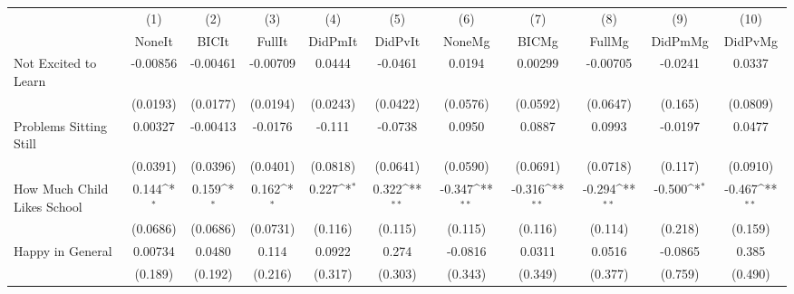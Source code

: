 {
\def\sym#1{\ifmmode^{#1}\else\(^{#1}\)\fi}
\begin{tabular}{l*{10}{c}}
\toprule
            &\multicolumn{1}{c}{(1)}&\multicolumn{1}{c}{(2)}&\multicolumn{1}{c}{(3)}&\multicolumn{1}{c}{(4)}&\multicolumn{1}{c}{(5)}&\multicolumn{1}{c}{(6)}&\multicolumn{1}{c}{(7)}&\multicolumn{1}{c}{(8)}&\multicolumn{1}{c}{(9)}&\multicolumn{1}{c}{(10)}\\
            &\multicolumn{1}{c}{NoneIt}&\multicolumn{1}{c}{BICIt}&\multicolumn{1}{c}{FullIt}&\multicolumn{1}{c}{DidPmIt}&\multicolumn{1}{c}{DidPvIt}&\multicolumn{1}{c}{NoneMg}&\multicolumn{1}{c}{BICMg}&\multicolumn{1}{c}{FullMg}&\multicolumn{1}{c}{DidPmMg}&\multicolumn{1}{c}{DidPvMg}\\
\midrule
Not Excited to Learn&    -0.00856         &    -0.00461         &    -0.00709         &      0.0444         &     -0.0461         &      0.0194         &     0.00299         &    -0.00705         &     -0.0241         &      0.0337         \\
            &    (0.0193)         &    (0.0177)         &    (0.0194)         &    (0.0243)         &    (0.0422)         &    (0.0576)         &    (0.0592)         &    (0.0647)         &     (0.165)         &    (0.0809)         \\
\addlinespace
Problems Sitting Still&     0.00327         &    -0.00413         &     -0.0176         &      -0.111         &     -0.0738         &      0.0950         &      0.0887         &      0.0993         &     -0.0197         &      0.0477         \\
            &    (0.0391)         &    (0.0396)         &    (0.0401)         &    (0.0818)         &    (0.0641)         &    (0.0590)         &    (0.0691)         &    (0.0718)         &     (0.117)         &    (0.0910)         \\
\addlinespace
How Much Child Likes School&       0.144\sym{*}  &       0.159\sym{*}  &       0.162\sym{*}  &       0.227\sym{*}  &       0.322\sym{**} &      -0.347\sym{**} &      -0.316\sym{**} &      -0.294\sym{**} &      -0.500\sym{*}  &      -0.467\sym{**} \\
            &    (0.0686)         &    (0.0686)         &    (0.0731)         &     (0.116)         &     (0.115)         &     (0.115)         &     (0.116)         &     (0.114)         &     (0.218)         &     (0.159)         \\
\addlinespace
Happy in General&     0.00734         &      0.0480         &       0.114         &      0.0922         &       0.274         &     -0.0816         &      0.0311         &      0.0516         &     -0.0865         &       0.385         \\
            &     (0.189)         &     (0.192)         &     (0.216)         &     (0.317)         &     (0.303)         &     (0.343)         &     (0.349)         &     (0.377)         &     (0.759)         &     (0.490)         \\
\bottomrule
\end{tabular}
}
